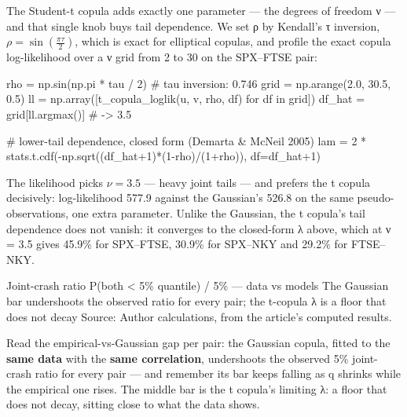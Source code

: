 \documentclass{pyportfolios-note}
\begin{document}

\noteneedroom{190bp}

The Student-t copula adds exactly one parameter — the degrees of freedom ν — and
that single knob buys tail dependence. We set ρ by Kendall's τ inversion,
$\rho = \sin\!\left(\tfrac{\pi\tau}{2}\right)$, which is exact for elliptical
copulas, and profile the exact copula log-likelihood over a ν grid from 2 to 30
on the SPX–FTSE pair:

\begin{notecode}
rho  = np.sin(np.pi * tau / 2)                  # tau inversion: 0.746
grid = np.arange(2.0, 30.5, 0.5)
ll   = np.array([t_copula_loglik(u, v, rho, df) for df in grid])
df_hat = grid[ll.argmax()]                      # -> 3.5

# lower-tail dependence, closed form (Demarta & McNeil 2005)
lam = 2 * stats.t.cdf(-np.sqrt((df_hat+1)*(1-rho)/(1+rho)), df=df_hat+1)
\end{notecode}

The likelihood picks $\nu = 3.5$ — heavy joint tails — and prefers the t copula
decisively: log-likelihood 577.9 against the Gaussian's 526.8 on the same
pseudo-observations, one extra parameter. Unlike the Gaussian, the t copula's
tail dependence does not vanish: it converges to the closed-form λ above, which
at ν = 3.5 gives 45.9\% for SPX–FTSE, 30.9\% for SPX–NKY and 29.2\% for
FTSE–NKY.

  {Joint-crash ratio P(both < 5\% quantile) / 5\% — data vs models}
  {The Gaussian bar undershoots the observed ratio for every pair; the t-copula
   λ is a floor that does not decay}
  {Source: Author calculations, from the article's computed results.}

Read the empirical-vs-Gaussian gap per pair: the Gaussian copula, fitted to the
\textbf{same data} with the \textbf{same correlation}, undershoots the observed
5\% joint-crash ratio for every pair — and remember its bar keeps falling as q
shrinks while the empirical one rises. The middle bar is the t copula's limiting
λ: a floor that does not decay, sitting close to what the data shows.
\end{document}

